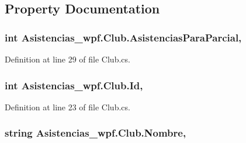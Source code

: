 \subsection{Property Documentation}
\hypertarget{class_asistencias__wpf_1_1_club_a1855a7a63b6465ef490871f93d385a69}{
\subsubsection[{Asistencias\-Para\-Parcial}]{\setlength{\rightskip}{0pt plus 5cm}int Asistencias\-\_\-wpf.\-Club.\-Asistencias\-Para\-Parcial\hspace{0.3cm}{\ttfamily [get]}, {\ttfamily [set]}}}\label{class_asistencias__wpf_1_1_club_a1855a7a63b6465ef490871f93d385a69}


Definition at line 29 of file Club.\-cs.

\hypertarget{class_asistencias__wpf_1_1_club_a25ec9c585f6874004dc690ea2641ab0d}{
\subsubsection[{Id}]{\setlength{\rightskip}{0pt plus 5cm}int Asistencias\-\_\-wpf.\-Club.\-Id\hspace{0.3cm}{\ttfamily [get]}, {\ttfamily [set]}}}\label{class_asistencias__wpf_1_1_club_a25ec9c585f6874004dc690ea2641ab0d}


Definition at line 23 of file Club.\-cs.

\hypertarget{class_asistencias__wpf_1_1_club_a0da21bbffe8ac3d877a51c03899bf8c2}{
\subsubsection[{Nombre}]{\setlength{\rightskip}{0pt plus 5cm}string Asistencias\-\_\-wpf.\-Club.\-Nombre\hspace{0.3cm}{\ttfamily [get]}, {\ttfamily [set]}}}\label{class_asistencias__wpf_1_1_club_a0da21bbffe8ac3d877a51c03899bf8c2}


